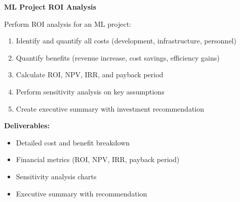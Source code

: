 \begin{exercise}
\textbf{ML Project ROI Analysis}

Perform ROI analysis for an ML project:

\begin{enumerate}
    \item Identify and quantify all costs (development, infrastructure, personnel)
    \item Quantify benefits (revenue increase, cost savings, efficiency gains)
    \item Calculate ROI, NPV, IRR, and payback period
    \item Perform sensitivity analysis on key assumptions
    \item Create executive summary with investment recommendation
\end{enumerate}

\textbf{Deliverables:}
\begin{itemize}
    \item Detailed cost and benefit breakdown
    \item Financial metrics (ROI, NPV, IRR, payback period)
    \item Sensitivity analysis charts
    \item Executive summary with recommendation
\end{itemize}
\end{exercise}
